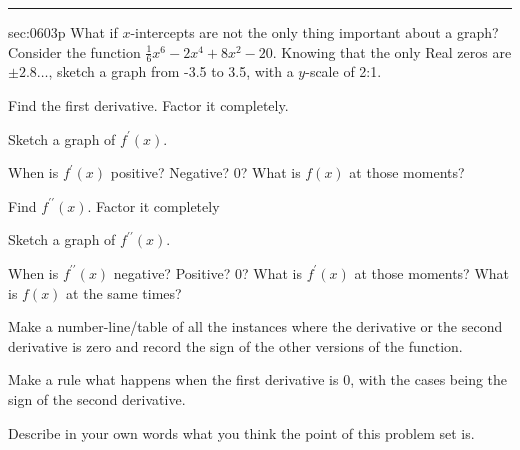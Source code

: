 \renewcommand{\columnseprule}{1.5pt}
\begin{multicols*}{2}
\rule[0.5\baselineskip]{0.4\textwidth}{1pt}
\noindent
{}\label{sec:0603p}
\begin{exercises}{sec:0603p}
\lab{} What if $x$-intercepts are not the only thing important about a graph?  Consider the function $\frac{1}{6}x^6-2x^4+8x^2-20$.  Knowing that the only Real zeros are $\pm2.8\dots$, sketch a graph from -3.5 to 3.5, with a $y$-scale of 2:1.



\vspace{4cm}
\lab{} Find the first derivative.  Factor it completely.




\vspace{3cm}
\lab{} Sketch a graph of $f^\prime(x)$.


\vspace{4cm}
\lab{} When is $f^\prime(x)$ positive?  Negative?  0?
What is $f(x)$ at those moments?


\vspace{3cm}
\lab{} Find $f^{\prime\prime}(x)$.  Factor it completely


\vspace{3cm}
\lab{} Sketch a graph of $f^{\prime\prime}(x)$.


\vspace{4cm}
\lab{} When is $f^{\prime\prime}(x)$ negative?  Positive?  0?
What is $f^\prime(x)$ at those moments?  What is $f(x)$ at the same times?



\vspace{3cm}
\lab{} Make a number-line/table of all the instances where the derivative or the second derivative is zero and record the sign of the other versions of the function.


\vspace{3cm}
\lab{} Make a rule what happens when the first derivative is 0, with the cases being the sign of the second derivative.



\vspace{3cm}
\lab{}  Describe in your own words what you think the point of this problem set is.
\end{exercises}
\end{multicols*}